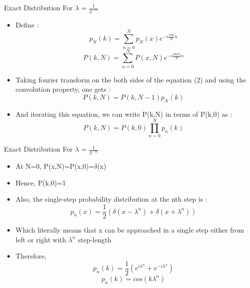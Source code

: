 \documentclass{beamer}
\begin{document}
\begin{frame}{Exact Distribution For $\lambda$ = $\frac{1}{2^{-m}}$}
	\begin{itemize}
	\setlength\itemsep{1em}
		\item{\large Define :}
		\begin{equation}
			p_{N}(k)=\sum_{n=0}^{N} p_{N}(x) e^{-i\frac{2\pi k}{N}n}
		\end{equation}
		\begin{equation}
			P(k,N)=\sum_{n=0}^{N} P(x,N) e^{-i\frac{2k \pi k}{N}n}
		\end{equation}
		\item{\large Taking fourier transform on the both sides of the equation (2) and using the convolution property, one gets :}
		\begin{equation}
			P(k,N) = P(k,N-1) p_{N}(k)
		\end{equation}
		\item{\large And iterating this equation, we can write P(k,N) in terms of P(k,0) as :}
		\begin{equation}
			P(k,N) = P(k,0) \prod_{n=0}^{N} p_n(k)
		\end{equation}
	\end{itemize}
\end{frame}

\begin{frame}{Exact Distribution For $\lambda$ = $\frac{1}{2^{-m}}$}
	\begin{itemize}
	\setlength\itemsep{1em}
		\item{\large At N=0, P(x,N)=P(x,0)=$\delta$(x)}
		\item{\large Hence, P(k,0)=1}
		\item{\large Also, the single-step probability distribution at the nth step is :}
		\begin{equation}
			p_{n}(x) = \frac{1}{2}(\delta(x-\lambda^{n})+\delta(x+\lambda^{n}))
		\end{equation}
		\item{\large Which literally means that x can be approached in a single step either from left or right with $\lambda^{n}$ step-length}
		\item{\large Therefore,}
		\begin{equation}
			p_{n}(k) = \frac{1}{2}(e^{i\lambda^{n}}+e^{-i\lambda^{n}})
		\end{equation}
		\begin{equation}
			p_{n}(k) = cos(k\lambda^{n})
		\end{equation}
	\end{itemize}
\end{frame}
\end{document}
